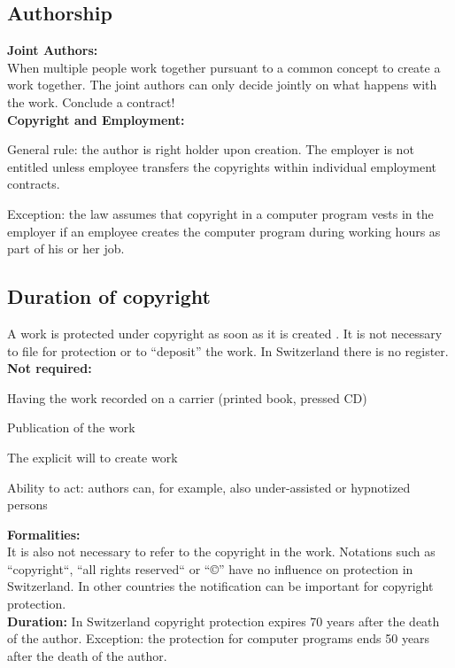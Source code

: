 \subsection{Authorship}
\textbf{Joint Authors:} \\
When multiple people work together pursuant to a common concept to create a work together. The joint authors can only decide jointly on what happens with the work. Conclude a contract! \\
\textbf{Copyright and Employment:} 
\begin{compactitem}
	\item General rule: the author is right holder upon creation. The employer is not entitled unless employee transfers the copyrights within individual employment contracts.
	\item Exception: the law assumes that copyright in a computer program vests in the employer if an employee creates the computer program during working hours as part of his or her job.
\end{compactitem}

\subsection{Duration of copyright}
A work is protected under copyright as soon as it is created . It is not necessary to file for protection or to “deposit” the work. In Switzerland there is no register.\\
\textbf{Not required:}
\begin{compactitem}
	\item Having the work recorded on a carrier (printed book, pressed CD)
	\item Publication of the work
	\item The explicit will to create work
	\item Ability to act: authors can, for example, also under-assisted or hypnotized persons
\end{compactitem}
\textbf{Formalities:} \\
It is also not necessary to refer to the copyright in the work. Notations such as “copyright“, “all rights reserved“ or “©” have no influence on protection in Switzerland. In other countries the notification can be important for copyright protection. \\
\textbf{Duration:}
In Switzerland copyright protection expires 70 years after the death of the author. Exception: the protection for computer programs ends 50 years after the death of the author.

